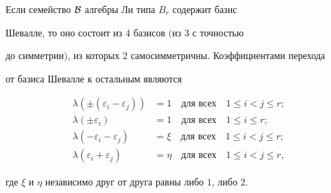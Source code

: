 \begin{athm}


Если семейство $\cal B$ алгебры Ли типа $B_r$ содержит базис 


Шевалле, то оно состоит из $4$ базисов $($из $3$ с точностью


до симметрии$)$, из которых $2$ самосимметричны. Коэффициентами перехода


от базиса Шевалле к остальным являются


\begin{equation}


\begin{split}


\lambda(\pm(\varepsilon_i-\varepsilon_j))&=1 \quad \text{для всех}\quad


1\le i<j\le r;\\


\lambda(\pm\varepsilon_i)&=1 \quad \text{для всех}\quad 1\le i\le r; \\


\lambda(-\varepsilon_i-\varepsilon_j)&=\xi \quad \text{для всех}\quad


1\le i<j\le r;\\


\lambda(\varepsilon_i+\varepsilon_j)&=\eta \quad \text{для всех}


\quad 1\le i<j\le r, 


\end{split}


\tag{$\mathrm b$}


\end{equation}


где $\xi$ и $\eta$ независимо друг от друга равны либо $1$, либо $2$.


\end{athm}





